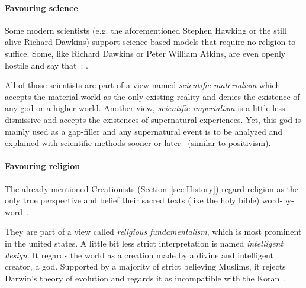 
\paragraph{Favouring science}
Some modern scientists (e.g. the aforementioned Stephen Hawking or the still alive Richard Dawkins) support science based-models that require no religion to suffice.
Some, like Richard Dawkins or Peter William Atkins, are even openly hostile and say that~\cite{dawkins2006god}: .

All of those scientists are part of a view named \emph{scientific materialism} which accepts the material world as the only existing reality and denies the existence of any god or a higher world.
Another view, \emph{scientific imperialism} is a little less dismissive and accepts the existences of supernatural experiences.
Yet, this god is mainly used as a gap-filler and any supernatural event is to be analyzed and explained with scientific methods sooner or later~\cite{krishna1971gopi} (similar to positivism). %


\paragraph{Favouring religion}
The already mentioned Creationists (Section~\ref{sec:History}) regard religion as the only true perspective and belief their sacred texts (like the holy bible) word-by-word~\cite{Hameed1637}.

They are part of a view called \emph{religious fundamentalism}, which is most prominent in the united states.
A little bit less strict interpretation is named \emph{intelligent design}. It regards the world as a creation made by a divine and intelligent creator, a god.
Supported by a majority of strict believing Muslims, it rejects Darwin's theory of evolution and regards it as incompatible with the Koran~\cite{Demirci2016}.


